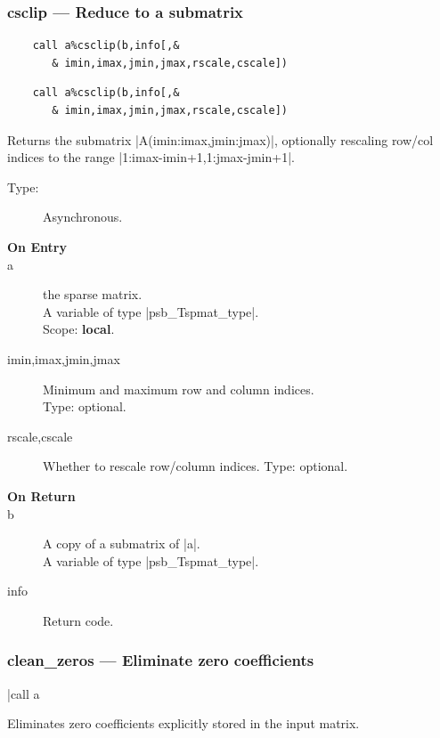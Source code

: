 \subsubsection{csclip --- Reduce to a submatrix}

\ifpdf
\begin{verbatim}
    call a%csclip(b,info[,&
       & imin,imax,jmin,jmax,rscale,cscale])
\end{verbatim}
\else
\begin{verbatim}
    call a%csclip(b,info[,&
       & imin,imax,jmin,jmax,rscale,cscale])
\end{verbatim}
\fi

Returns the submatrix \fortinline|A(imin:imax,jmin:jmax)|, optionally
rescaling row/col indices to the range
\fortinline|1:imax-imin+1,1:jmax-jmin+1|.  
\begin{description}
\item[Type:] Asynchronous.
\item[\bf On Entry]
\item[a] the sparse matrix.\\
A variable of type \fortinline|psb_Tspmat_type|.\\
Scope: {\bf local}.\\
\item[imin,imax,jmin,jmax] Minimum and maximum row and column indices.\\
Type: optional.
\item[rscale,cscale] Whether to rescale row/column indices.
Type: optional.
\end{description}
\begin{description}
\item[\bf On Return]
\item[b] A copy  of a submatrix of \fortinline|a|.\\
A variable of type \fortinline|psb_Tspmat_type|.
\item[info] Return code. 
\end{description}

\subsubsection{clean\_zeros --- Eliminate zero coefficients}
\fortinline|call a%

Eliminates zero coefficients explicitly stored in the input matrix.  

